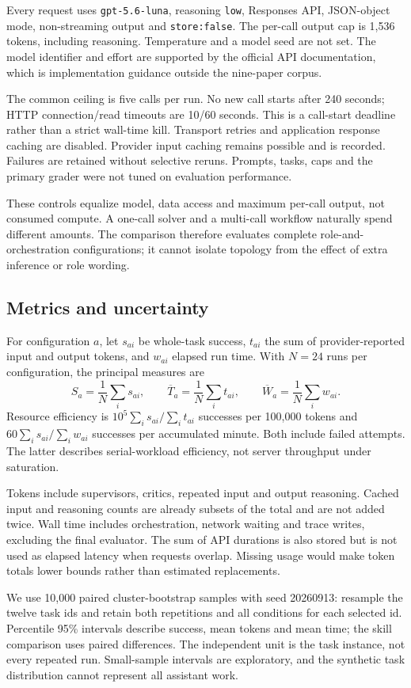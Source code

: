 Every request uses \texttt{gpt-5.6-luna}, reasoning \texttt{low}, Responses API, JSON-object mode, non-streaming output and \texttt{store:false}. The per-call output cap is 1,536 tokens, including reasoning. Temperature and a model seed are not set. The model identifier and effort are supported by the official API documentation, which is implementation guidance outside the nine-paper corpus.

The common ceiling is five calls per run. No new call starts after 240 seconds; HTTP connection/read timeouts are 10/60 seconds. This is a call-start deadline rather than a strict wall-time kill. Transport retries and application response caching are disabled. Provider input caching remains possible and is recorded. Failures are retained without selective reruns. Prompts, tasks, caps and the primary grader were not tuned on evaluation performance.

These controls equalize model, data access and maximum per-call output, not consumed compute. A one-call solver and a multi-call workflow naturally spend different amounts. The comparison therefore evaluates complete role-and-orchestration configurations; it cannot isolate topology from the effect of extra inference or role wording.

\subsection{Metrics and uncertainty}
For configuration $a$, let $s_{ai}$ be whole-task success, $t_{ai}$ the sum of provider-reported input and output tokens, and $w_{ai}$ elapsed run time. With $N=24$ runs per configuration, the principal measures are
\begin{equation}
S_a=\frac{1}{N}\sum_i s_{ai},\qquad
\overline T_a=\frac{1}{N}\sum_i t_{ai},\qquad
\overline W_a=\frac{1}{N}\sum_i w_{ai}.
\end{equation}
Resource efficiency is $10^5\sum_i s_{ai}/\sum_i t_{ai}$ successes per 100,000 tokens and $60\sum_i s_{ai}/\sum_i w_{ai}$ successes per accumulated minute. Both include failed attempts. The latter describes serial-workload efficiency, not server throughput under saturation.

Tokens include supervisors, critics, repeated input and output reasoning. Cached input and reasoning counts are already subsets of the total and are not added twice. Wall time includes orchestration, network waiting and trace writes, excluding the final evaluator. The sum of API durations is also stored but is not used as elapsed latency when requests overlap. Missing usage would make token totals lower bounds rather than estimated replacements.

We use 10,000 paired cluster-bootstrap samples with seed 20260913: resample the twelve task ids and retain both repetitions and all conditions for each selected id. Percentile 95\% intervals describe success, mean tokens and mean time; the skill comparison uses paired differences. The independent unit is the task instance, not every repeated run. Small-sample intervals are exploratory, and the synthetic task distribution cannot represent all assistant work.
